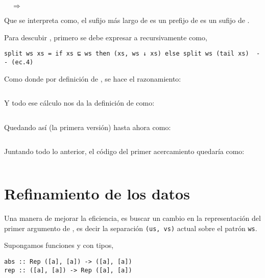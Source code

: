  $\quad\Longrightarrow\quad$ 

Que se interpreta como, el sufijo más largo de  es un prefijo de  es un
sufijo de .

Para descubir , primero se debe expresar a  recursivamente como,
\begin{verbatim}
split ws xs = if xs ⊑ ws then (xs, ws ↓ xs) else split ws (tail xs)  -- (ec.4)
\end{verbatim}

Como  donde por definición de ,
se hace el razonamiento:

\inputminted{haskell}{definiciones/kmp/1-op-raz-eq.hs}

Y todo ese cálculo nos da la definición de  como:

\inputminted{haskell}{definiciones/kmp/1-op.hs}

Quedando así (la primera versión) hasta ahora como:

\inputminted{haskell}{definiciones/kmp/1-final.hs}



Juntando todo lo anterior, el código del primer acercamiento quedaría como:

\inputminted{haskell}{codigo/haskell/1-first-steps.hs}


\section{Refinamiento de los datos}

Una manera de mejorar la eficiencia, es buscar un cambio en la representación del primer argumento 
de , es decir la separación \texttt{(us, vs)} actual sobre el patrón \texttt{ws}.

Supongamos funciones  y  con tipos,

\begin{verbatim}
abs :: Rep ([a], [a]) -> ([a], [a])
rep :: ([a], [a]) -> Rep ([a], [a])
\end{verbatim}

